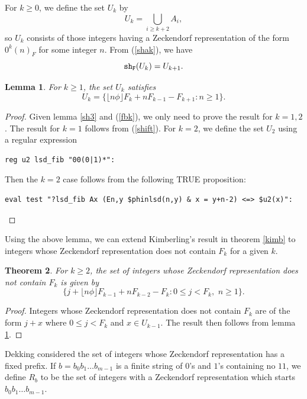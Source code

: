 \documentclass[12pt]{article}
\theoremstyle{plain}
\newtheorem{theorem}{Theorem}
\newtheorem{lemma}[theorem]{Lemma}
\theoremstyle{case}
\theoremstyle{definition}
\begin{document}
\bigskip

For $k \geq 0$,  we define the set $U_k$ by
$$
U_k = \bigcup_{i \geq k+2} A_i ,
$$
so $U_k$ consists of those integers having a Zeckendorf representation of the form $0^k (n)_F$ for some integer $n$. From (\ref{shak}), we have
\begin{equation}
\label{fbk}
{\tt sh_F} (U_k) = U_{k+1} .
\end{equation}

\bigskip

\begin{lemma}
\label{bklem}
For $k \geq 1$, the set $U_k$ satisfies
$$
U_k =  \{ \lfloor n \phi \rfloor F_k + n F_{k-1} - F_{k+1} : n \geq 1 \} .
$$
\end{lemma}
\begin{proof}
Given lemma \ref{sh3} and (\ref{fbk}), we only need to prove the result for $k=1, 2$. The result for $k=1$ follows from (\ref{shift}). For $k=2$, we define the set $U_2$ using a regular expression
\begin{verbatim}
reg u2 lsd_fib "00(0|1)*":
\end{verbatim}
Then the $k=2$ case follows from the following TRUE proposition:
\begin{verbatim}
eval test "?lsd_fib Ax (En,y $phinlsd(n,y) & x = y+n-2) <=> $u2(x)":
\end{verbatim}
\end{proof}

\bigskip

Using the above lemma, we can extend Kimberling's result in theorem \ref{kimb} to integers whose Zeckendorf representation does not contain $F_k$ for a given $k$.

\bigskip

\begin{theorem}
For $k \geq 2$, the set of integers whose Zeckendorf representation does not contain $F_k$ is given by
$$
\{ j +  \lfloor n \phi \rfloor F_{k-1} + n F_{k-2} - F_{k} : 0 \leq j < F_k,  \,\, n \geq 1 \} .
$$
\end{theorem}
\begin{proof}
Integers whose Zeckendorf representation does not contain $F_k$ are of the form $j + x$ where $0 \leq j < F_k$ and $x \in U_{k-1}$. The result then follows from lemma \ref{bklem}.
\end{proof}

\bigskip
Dekking considered the set of integers whose Zeckendorf representation has a fixed prefix.\cite{https://doi.org/10.5281/zenodo.10803363} If $b = b_0 b_1 \dots b_{m-1}$ is a finite string of $0$'s and $1$'s containing no $11$, we define $R_b$ to be the set of integers with a Zeckendorf representation which starts $ b_0 b_1 \dots b_{m-1}$.
\end{document}
